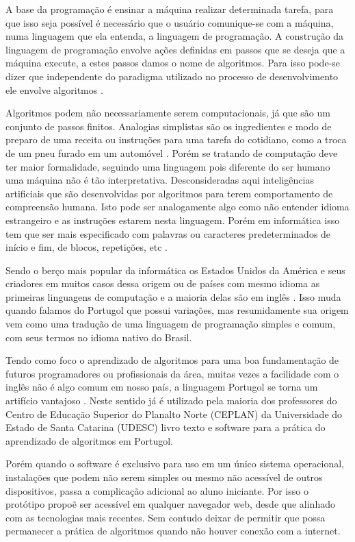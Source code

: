 \ifdraft{\color{green}}{}A base da programação é ensinar a máquina realizar determinada tarefa, para que isso seja possível é necessário que o usuário comunique-se com a máquina, numa linguagem que ela entenda, a linguagem de programação. A construção da linguagem de programação envolve ações definidas em passos que se deseja que a máquina execute, a estes passos damos o nome de algoritmos. Para isso pode-se dizer que independente do paradigma utilizado no processo de desenvolvimento ele envolve algoritmos \cite{medeiros2015}.

Algoritmos podem não necessariamente serem computacionais, já que são um conjunto de passos finitos. Analogias simplistas são os ingredientes e modo de preparo de uma receita ou instruções para uma tarefa do cotidiano, como a troca de um pneu furado em um automóvel \cite{medina2006etal}. Porém se tratando de computação deve ter maior formalidade, seguindo uma linguagem pois diferente do ser humano uma máquina não é tão interpretativa. Desconsideradas aqui inteligências artificiais que são desenvolvidas por algoritmos para terem  comportamento de compreensão humana. Isto pode ser analogamente algo como não entender idioma estrangeiro e as instruções estarem nesta linguagem. Porém em informática isso tem que ser mais especificado com palavras ou caracteres predeterminados de início e fim, de blocos, repetições, etc \cite{dershem1990etal}.

Sendo o berço mais popular da informática os Estados Unidos da América e seus criadores em muitos casos dessa origem ou de países com mesmo idioma as primeiras linguagens de computação e a maioria delas são em inglês \cite{sebesta2009}. Isso muda quando falamos do Portugol que possui variações, mas resumidamente sua origem vem como uma tradução de uma linguagem de programação simples e comum, com seus termos no idioma nativo do Brasil.

Tendo como foco o aprendizado de algoritmos para uma boa fundamentação de futuros programadores ou profissionais da área, muitas vezes a facilidade com o inglês não é algo comum em nosso país, a linguagem Portugol se torna um artifício vantajoso \cite{jesus2004etal}.  Neste sentido já é utilizado pela maioria dos professores do Centro de Educação Superior do Planalto Norte (CEPLAN) da Universidade do Estado de Santa Catarina (UDESC) livro texto e software para a prática do aprendizado de algoritmos em Portugol.

Porém quando o software é exclusivo para uso em um único sistema operacional, instalações que podem não serem simples ou mesmo não acessível de outros dispositivos, passa a complicação adicional ao aluno iniciante. Por isso o protótipo propoẽ ser acessível em qualquer navegador web, desde que alinhado com as tecnologias mais recentes. Sem contudo deixar de permitir que possa permanecer a prática de algoritmos quando não houver conexão com a internet.
